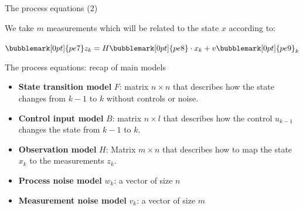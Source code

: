 \documentclass[compress]{beamer}
\begin{document}
\begin{frame}{The process equations (2)}

    We take $m$ measurements which will be related to the state
  $x$ according to:

    \vspace{3em}

    \Huge\centering
    $\bubblemark[0pt]{pe7}z_k = H\bubblemark[0pt]{pe8} \cdot x_k + v\bubblemark[0pt]{pe9}_k$


\end{frame}

\begin{frame}{The process equations: recap of main models}

\begin{itemize}
    \item \textbf{State transition model} $F$: matrix $n \times n$ that describes how the state
  changes from $k-1$ to $k$ without controls or noise.
    \item \textbf{Control input model} $B$: matrix $n \times l$ that describes how the
        control $u_{k-1}$ changes the state from $k-1$ to $k$.
    \item \textbf{Observation model} $H$: Matrix $m \times n$ that describes how to map the
  state $x_k$ to the measurements $z_k$.
\end{itemize}

\pause

    \begin{itemize}
        \item \textbf{Process noise model} $w_k$: a vector of size $n$
        \item \textbf{Measurement noise model} $v_k$: a vector of size $m$
    \end{itemize}

\end{frame}
\end{document}

